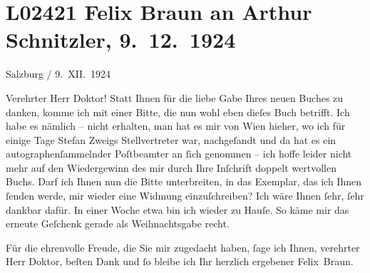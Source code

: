 

\section[Felix Braun an Arthur Schnitzler, 9. 12. 1924]{L02421 Felix Braun an Arthur Schnitzler, 9. 12. 1924}
\nopagebreak{}
\rehead{ }\normalsize\beginnumbering{}
\toendnotes[C]{\smallbreak\pagebreak[2]}
\toendnotes[C]{\smallbreak}
\pstart
           \centering{}{\pb}Salzburg / 9. XII. 1924\pend
           
\pstart{}Verehrter Herr Doktor!\pend\vspace{0.5em}
\pstart
           Statt Ihnen für die liebe Gabe Ihres neuen Buches zu danken, komme ich mit einer Bitte, die nun wohl
               eben dieſes Buch betrifft. Ich
               habe es nämlich – nicht erhalten, man hat es mir von Wien hieher, wo ich für einige Tage Stefan
                  Zweigs Stellvertreter war, nachgeſandt und da hat es ein
               autographenſammelnder Poſtbeamter an ſich genommen – ich hoffe leider nicht mehr auf
               den Wiedergewinn des mir durch Ihre Inſchrift doppelt wertvollen Buchs. Darf ich Ihnen nun die Bitte
               unterbreiten, in das Exemplar, das ich Ihnen ſenden werde, mir wieder eine Widmung
               einzuſchreiben? Ich wäre Ihnen ſehr, ſehr dankbar dafür. In einer Woche etwa bin ich
               wieder zu Hauſe. {\pb}So käme mir das erneute Geſchenk
               gerade als Weihnachtsgabe recht.\pend
           
\pstart
           Für die ehrenvolle Freude, die Sie mir zugedacht haben, ſage ich Ihnen, verehrter
               Herr Doktor, beſten Dank und ſo bleibe ich Ihr herzlich ergebener\pend
           \pstart \spacefill\mbox{Felix Braun.}\pend{}\endnumbering{}  
      